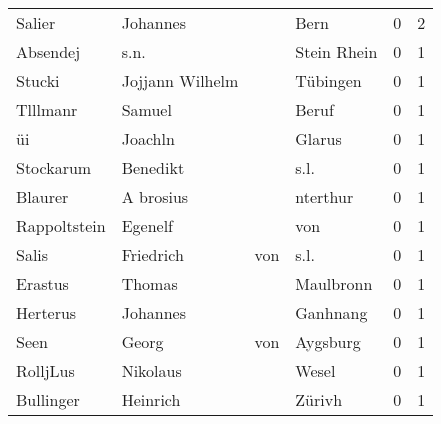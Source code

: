 \begin{tabular}{llllrr}
                   Salier &                           Johannes &             &                                        Bern &          0 &         2 \\
                 Absendej &                               s.n. &             &                                 Stein Rhein &          0 &         1 \\
                   Stucki &                    Jojjann Wilhelm &             &                                    Tübingen &          0 &         1 \\
                 Tlllmanr &                             Samuel &             &                                       Beruf &          0 &         1 \\
                       üi &                            Joachln &             &                                      Glarus &          0 &         1 \\
                Stockarum &                           Benedikt &             &                                        s.l. &          0 &         1 \\
                  Blaurer &                          A brosius &             &                                    nterthur &          0 &         1 \\
             Rappoltstein &                            Egenelf &             &                                         von &          0 &         1 \\
                    Salis &                          Friedrich &         von &                                        s.l. &          0 &         1 \\
                  Erastus &                             Thomas &             &                                   Maulbronn &          0 &         1 \\
                 Herterus &                           Johannes &             &                                    Ganhnang &          0 &         1 \\
                     Seen &                              Georg &         von &                                    Aygsburg &          0 &         1 \\
                 RolljLus &                           Nikolaus &             &                                       Wesel &          0 &         1 \\
                Bullinger &                           Heinrich &             &                                      Zürivh &          0 &         1 \\

\end{tabular}
